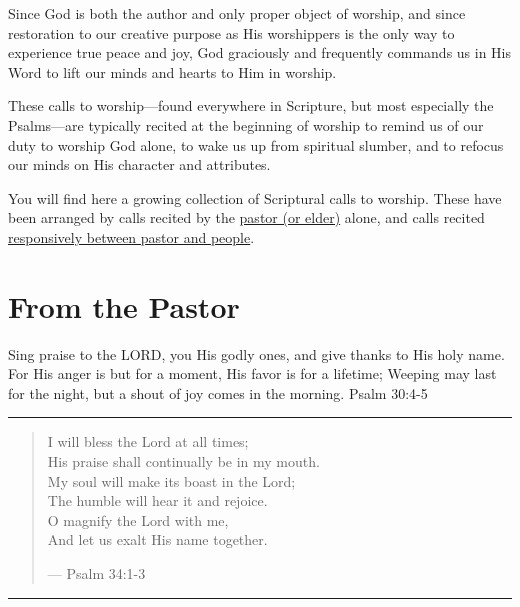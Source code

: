 \documentclass[]{book}
\begin{document}
Since God is both the author and only proper object of worship, and since restoration to our creative purpose as His worshippers is the only way to experience true peace and joy, God graciously and frequently commands us in His Word to lift our minds and hearts to Him in worship.

These calls to worship---found everywhere in Scripture, but most especially the Psalms---are typically recited at the beginning of worship to remind us of our duty to worship God alone, to wake us up from spiritual slumber, and to refocus our minds on His character and attributes.

You will find here a growing collection of Scriptural calls to worship. These have been arranged by calls recited by the \protect\hyperlink{from-the-fastor}{pastor (or elder)} alone, and calls recited \protect\hyperlink{responsive-calls}{responsively between pastor and people}.

\hypertarget{from-the-pastor}{%
\section{From the Pastor}\label{from-the-pastor}}

Sing praise to the LORD, you His godly ones, and give thanks to His holy name. For His anger is but for a moment, His favor is for a lifetime; Weeping may last for the night, but a shout of joy comes in the morning. \textbar{} Psalm 30:4-5

\begin{center}\rule{0.5\linewidth}{\linethickness}\end{center}

\begin{quote}
I will bless the Lord at all times;\\
His praise shall continually be in my mouth.\\
My soul will make its boast in the Lord;\\
The humble will hear it and rejoice.\\
O magnify the Lord with me,\\
And let us exalt His name together.

--- Psalm 34:1-3
\end{quote}

\begin{center}\rule{0.5\linewidth}{\linethickness}\end{center}
\end{document}
